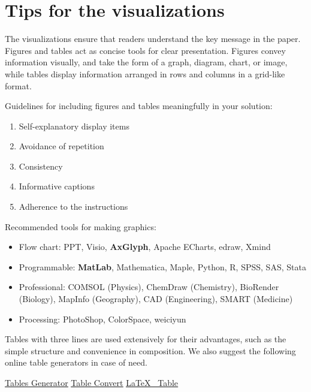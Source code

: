 \documentclass[12pt]{article}  %
\begin{document}
 \section{Tips for the visualizations}
 
 
 The visualizations ensure that readers understand the key message in the paper. Figures and tables act as concise tools for clear presentation. Figures convey information visually, and take the form of a graph, diagram, chart, or image, while tables display information arranged in rows and columns in a grid-like format.
 
 Guidelines for including figures and tables meaningfully in your solution:
 \begin{enumerate}[(1)]
     \item  Self-explanatory display items
     \item Avoidance of repetition
     \item Consistency
     \item Informative captions
     \item Adherence to the instructions
 \end{enumerate}
 
 Recommended tools for making graphics:
 \begin{itemize}
     \setlength{\parsep}{0ex} %
     \setlength{\topsep}{2ex} %
     \setlength{\itemsep}{1ex} %
     \item Flow chart: PPT, Visio, \textbf{AxGlyph}, Apache ECharts, edraw, Xmind
     \item Programmable: \textbf{MatLab}, Mathematica, Maple, Python, R, SPSS, SAS, Stata
     \item Professional: COMSOL (Physics), ChemDraw (Chemistry), BioRender (Biology), MapInfo (Geography), CAD (Engineering), SMART (Medicine)
     \item Processing: PhotoShop, ColorSpace, weiciyun
 \end{itemize}
 
 
 Tables with three lines are used extensively for their advantages, such as the simple structure and convenience in composition. We also suggest the following online table generators in case of need.
 
  \href{https://www.tablesgenerator.com/}{\underline{Tables Generator}} 
     \qquad \href{https://tableconvert.com/}{\underline{Table Convert}}
     \qquad \href{https://www.latex-tables.com/}{\underline{\LaTeX ~ Table}}
  
 
 
\end{document}
